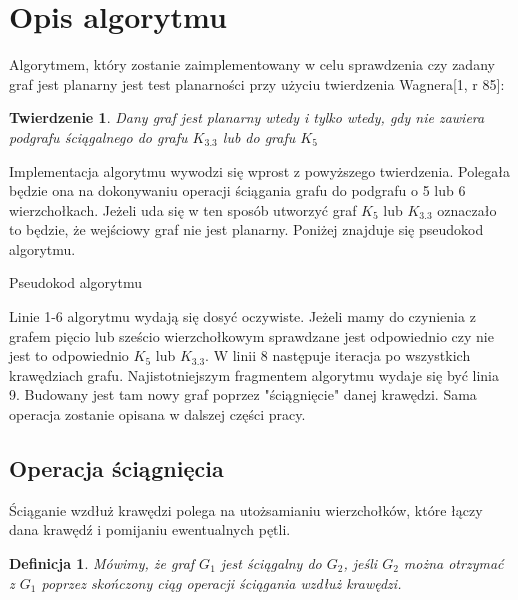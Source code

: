 \documentclass[a4 122pt]{article}
\newtheorem{twierdzenie}{Twierdzenie}
\newtheorem{definicja}{Definicja}
\newenvironment{algorytm}[1][htb]
  {\renewcommand{\algorithmcfname}{Algorytm}%
   \begin{algorithm}[#1]%
  }{\end{algorithm}}
\begin{document}
	\section{Opis algorytmu}	
	Algorytmem, który zostanie zaimplementowany w celu sprawdzenia czy zadany graf jest planarny jest test planarności przy użyciu twierdzenia Wagnera[1, r 85]:
	\begin{twierdzenie}
	Dany graf jest planarny wtedy i tylko wtedy, gdy nie zawiera podgrafu ściągalnego do grafu $K_{3.3}$ lub do grafu $ K_5 $
	\end{twierdzenie}
	Implementacja algorytmu wywodzi się wprost z powyższego twierdzenia. 
	Polegała będzie ona na dokonywaniu operacji ściągania grafu do podgrafu o 5 lub 6 wierzchołkach.
	Jeżeli uda się w ten sposób utworzyć graf $ K_5 $ lub $K_{3.3}$ oznaczało to będzie, że wejściowy graf nie jest planarny.
	Poniżej znajduje się pseudokod algorytmu.
	
	\begin{algorytm}[H]
	\newcommand{\forcond}{$i=0$ \KwTo $n$}
	\caption{Pseudokod algorytmu}
	\end{algorytm}
	
	Linie 1-6 algorytmu wydają się dosyć oczywiste. 
	Jeżeli mamy do czynienia z grafem pięcio lub sześcio wierzchołkowym sprawdzane jest odpowiednio czy nie jest to odpowiednio $K_5$ lub $K_{3.3}$. 
	W linii 8 następuje iteracja po wszystkich krawędziach grafu. 
	Najistotniejszym fragmentem algorytmu wydaje się być linia 9. 
	Budowany jest tam nowy graf poprzez "ściągnięcie" danej krawędzi. 
	Sama operacja zostanie opisana w dalszej części pracy.
	
	\subsection{Operacja ściągnięcia}
		Ściąganie wzdłuż krawędzi polega na utożsamianiu wierzchołków, które łączy dana krawędź i pomijaniu ewentualnych pętli. 
 		
		\begin{definicja}
			Mówimy, że graf $G_1$ jest ściągalny do $G_2$, jeśli $G_2$ można otrzymać z $G_1$ poprzez skończony ciąg operacji ściągania wzdłuż krawędzi.
		\end{definicja}
		
\end{document}
